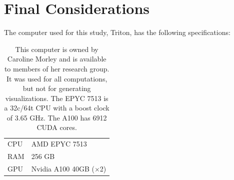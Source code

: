 \documentclass[twocolumn]{aastex631}
\begin{document}
\section{Final Considerations}
The computer used for this study, Triton, has the following specifications:
\begin{table}[h!]
    \centering
    \begin{tabular}{ll}
        \hline
        CPU & AMD EPYC 7513\\
        RAM & 256 GB\\
        GPU & Nvidia A100 40GB ($\times$2)\\
        \hline
    \end{tabular}
    \caption{This computer is owned by Caroline Morley and is available to
    members of her research group. It was used for all computations, but not 
    for generating visualizations. The EPYC 7513 is a 32c/64t CPU with a 
    boost clock of 3.65 GHz. The A100 has 6912 CUDA cores.}
\end{table}
\end{document}
